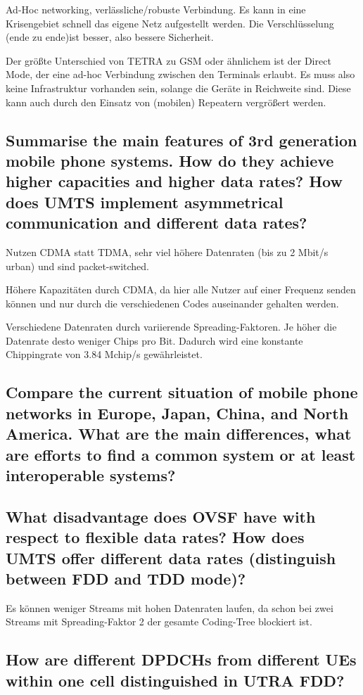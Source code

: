 Ad-Hoc networking, verlässliche/robuste Verbindung. Es kann in eine Krisengebiet schnell das eigene Netz aufgestellt werden. Die Verschlüsselung (ende zu ende)ist besser, also bessere Sicherheit. 

Der größte Unterschied von TETRA zu GSM oder ähnlichem ist der Direct Mode, der eine ad-hoc Verbindung zwischen den Terminals erlaubt. Es muss also keine Infrastruktur vorhanden sein, solange die Geräte in Reichweite sind. Diese kann auch durch den Einsatz von (mobilen) Repeatern vergrößert werden.

\subsection{Summarise the main features of 3rd generation mobile phone systems. How do they achieve higher capacities and higher data rates? How does UMTS implement asymmetrical communication and different data rates?}
Nutzen CDMA statt TDMA, sehr viel höhere Datenraten (bis zu 2 Mbit/s urban) und sind packet-switched.

Höhere Kapazitäten durch CDMA, da hier alle Nutzer auf einer Frequenz senden können und nur durch die verschiedenen Codes auseinander gehalten werden. 

Verschiedene Datenraten durch variierende Spreading-Faktoren. Je höher die Datenrate desto weniger Chips pro Bit. Dadurch wird eine konstante Chippingrate von 3.84 Mchip/s gewährleistet. 

\subsection{Compare the current situation of mobile phone networks in Europe, Japan, China, and North America. What are the main differences, what are efforts to find a common system or at least interoperable systems?}

\subsection{What disadvantage does OVSF have with respect to flexible data rates? How does UMTS offer different data rates (distinguish between FDD and TDD mode)?}
Es können weniger Streams mit hohen Datenraten laufen, da schon bei zwei Streams mit Spreading-Faktor 2 der gesamte Coding-Tree blockiert ist.

\subsection{How are different DPDCHs from different UEs within one cell distinguished in UTRA FDD?}

